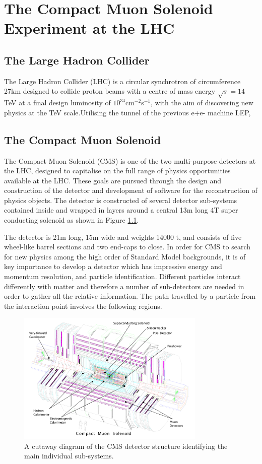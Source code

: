 \chapter{The Compact Muon Solenoid Experiment at the LHC}
\section{The Large Hadron Collider}
The Large Hadron Collider (LHC) is a circular synchrotron of circumference 27km designed to collide proton beams with a centre of mass energy $\sqrt{s}  = 14$\,TeV at a final design luminosity of $10^{34}$cm$^{-2}$s$^{-1}$, with the aim of discovering new physics at the TeV scale.Utilising the tunnel of the previous e+e- machine LEP, 


\section{The Compact Muon Solenoid}

The Compact Muon Solenoid (CMS) is one of the two multi-purpose detectors at the LHC, designed to capitalise on the full range of physics opportunities available at the LHC. These goals are pursued through the design and construction of the detector and development of software for the reconstruction of physics objects. The detector is constructed of several detector sub-systems contained inside and wrapped in layers around a central 13m long 4T super conducting solenoid as shown in Figure \ref{fig:CMS_Struct}. 

The detector is 21m long, 15m wide and weights 14000 t, and consists of five wheel-like barrel sections and two end-caps to close. In order for CMS to search for new physics among the high order of Standard Model backgrounds, it is of key importance to develop a detector which has impressive energy and momentum resolution, and particle identification. Different particles interact differently with matter and therefore a number of sub-detectors are needed in order to gather all the relative information. The path travelled by a particle from the interaction point involves the following regions. 

\begin{figure}
\centering
\includegraphics[width=0.8\textwidth]{Figures/Detector/CMS_Structure}
\caption{A cutaway diagram of the CMS detector structure identifying the main individual sub-systems.}
\label{fig:CMS_Struct}
\end{figure}


